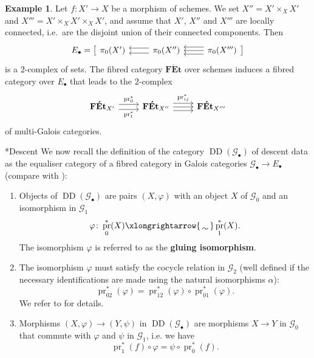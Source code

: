 \documentclass[a4paper,twoside,11pt,reqno]{amsart}
\makeatletter
\newcommand{\cG}{{\mathcal G}}
\newcommand{\isomto}{\xlongrightarrow{\,\smash{\raisebox{-0.65ex} 
    {\ensuremath{\displaystyle\sim}}}\,}}
\DeclareMathOperator{\pr}{pr}
\newcommand{\cat}[1]{\mathbf{#1}}
\newcommand{\FEt}{\cat{F\acute{E}t}}
\newcommand{\ph}{\varphi}
\DeclareMathOperator{\Desc}{DD}
\def\subsubsection{\@startsection{subsubsection}{3}%
      \z@{.5\linespacing\@plus.7\linespacing}{-.5em}%
      {\normalfont\bfseries}}
\theoremstyle{definition}
\newtheorem{ex}[thm]{Example}
\numberwithin{equation}{subsection}
\makeatother
\begin{document}
\begin{ex}
\label{ex:FETdescent}
    Let $f\colon  X' \to X$ be a morphism of schemes. We set $X'' = X' \times_X X'$ and $X'''=X' \times_X X' \times_X X'$, and assume that $X'$, $X''$ and $X'''$ are locally connected, i.e.\ are the disjoint union of their connected components. Then 
    \[
    E_\bullet = \big[
    \begin{tikzcd} 
    \pi_0(X') & \ar[l,shift right=0.7ex] \ar[l,shift left=0.7ex] \pi_0(X'')  & \ar[l,shift right=1ex] \ar[l,shift left=1ex] \ar[l] \pi_0(X''')
    \end{tikzcd}
    \big]
    \]
    is a $2$-complex of sets. The fibred category $\FEt$ over schemes induces a fibred category over $E_\bullet$ that leads to the $2$-complex 
    \[
    \begin{tikzcd} 
    \FEt_{X'} \ar[r,shift left=0.7ex,"{\pr_0^\ast}"] \ar[r,shift right=0.7ex,"\pr_1^\ast",swap]   &  \FEt_{X''}  \ar[r, shift left=1ex,"{\pr_{ij}^\ast}"] \ar[r,shift right=1ex] \ar[r] & \FEt_{X'''} 
    \end{tikzcd}
    \]
    of multi-Galois categories. 
\end{ex}


\subsubsection*{Descent} 
We now recall the definition of the category $\Desc(\cG_\bullet)$ of descent data as the equaliser category of a fibred category in Galois categories $\cG_\bullet \to E_\bullet$  (compare with \cite[Definition~4.1]{Stix2006:vanKampen}):
\begin{enumerate}
    \item 
    Objects of $\Desc(\cG_\bullet)$ are pairs $(X,\ph)$ with an object $X$ of $\cG_0$ and an isomorphism in $\cG_1$
    \[
    \ph \colon \pr_0^\ast(X) \isomto \pr_1^\ast(X).
    \]
    The isomorphism $\ph$ is referred to as the \textbf{gluing isomorphism}. 
    \item
    The isomorphism $\ph$ must satisfy the cocycle relation in $\cG_2$ (well defined if the necessary identifications are made using the natural isomorphisms $\alpha$):
    \[
    \pr_{02}^\ast(\ph) = \pr_{12}^\ast(\ph) \circ \pr_{01}^\ast(\ph).
    \]
    We refer to \cite[Definition~4.1]{Stix2006:vanKampen} for details.  
    \item 
    Morphisms $(X,\ph) \to (Y,\psi)$ in $\Desc(\cG_\bullet)$ are morphisms $X \to Y$ in $\cG_0$ that commute with $\ph$ and $\psi$ in $\cG_1$, i.e. we have
    \[
    \pr_1^\ast(f) \circ \ph = \psi \circ \pr_0^\ast(f).
    \]
\end{enumerate}
\end{document}
